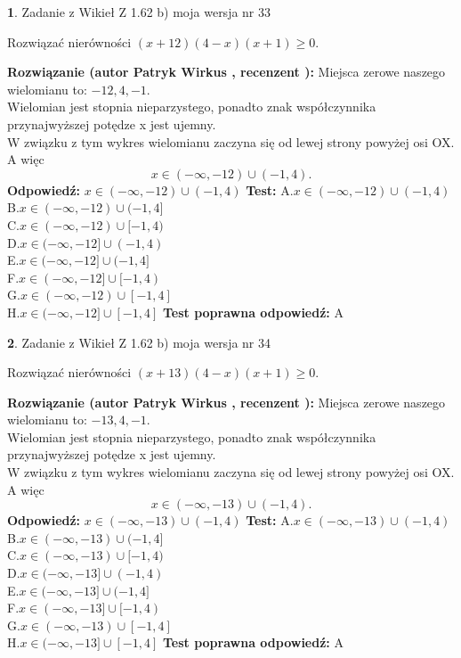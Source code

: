 \documentclass[12pt, a4paper]{article}
\theoremstyle{definition} %
\newtheorem{zad}{}
\newcommand{\zadStart}[1]{\begin{zad}#1\newline}
\newcommand{\zadStop}{\end{zad}}
\newcommand{\rozwStart}[2]{\noindent \textbf{Rozwiązanie (autor #1 , recenzent #2): }\newline}
\newcommand{\rozwStop}{\newline}
\newcommand{\odpStart}{\noindent \textbf{Odpowiedź:}\newline}
\newcommand{\odpStop}{\newline}
\newcommand{\testStart}{\noindent \textbf{Test:}\newline}
\newcommand{\testStop}{\newline}
\newcommand{\kluczStart}{\noindent \textbf{Test poprawna odpowiedź:}\newline}
\newcommand{\kluczStop}{\newline}
\begin{document}
\zadStart{Zadanie z Wikieł Z 1.62 b) moja wersja nr 33}

Rozwiązać nierówności $(x+12)(4-x)(x+1)\ge0$.
\zadStop
\rozwStart{Patryk Wirkus}{}
Miejsca zerowe naszego wielomianu to: $-12, 4, -1$.\\
Wielomian jest stopnia nieparzystego, ponadto znak współczynnika przy\linebreak najwyższej potędze x jest ujemny.\\ W związku z tym wykres wielomianu zaczyna się od lewej strony powyżej osi OX. A więc $$x \in (-\infty,-12) \cup (-1,4).$$
\rozwStop
\odpStart
$x \in (-\infty,-12) \cup (-1,4)$
\odpStop
\testStart
A.$x \in (-\infty,-12) \cup (-1,4)$\\
B.$x \in (-\infty,-12) \cup (-1,4]$\\
C.$x \in (-\infty,-12) \cup [-1,4)$\\
D.$x \in (-\infty,-12] \cup (-1,4)$\\
E.$x \in (-\infty,-12] \cup (-1,4]$\\
F.$x \in (-\infty,-12] \cup [-1,4)$\\
G.$x \in (-\infty,-12) \cup [-1,4]$\\
H.$x \in (-\infty,-12] \cup [-1,4]$
\testStop
\kluczStart
A
\kluczStop



\zadStart{Zadanie z Wikieł Z 1.62 b) moja wersja nr 34}

Rozwiązać nierówności $(x+13)(4-x)(x+1)\ge0$.
\zadStop
\rozwStart{Patryk Wirkus}{}
Miejsca zerowe naszego wielomianu to: $-13, 4, -1$.\\
Wielomian jest stopnia nieparzystego, ponadto znak współczynnika przy\linebreak najwyższej potędze x jest ujemny.\\ W związku z tym wykres wielomianu zaczyna się od lewej strony powyżej osi OX. A więc $$x \in (-\infty,-13) \cup (-1,4).$$
\rozwStop
\odpStart
$x \in (-\infty,-13) \cup (-1,4)$
\odpStop
\testStart
A.$x \in (-\infty,-13) \cup (-1,4)$\\
B.$x \in (-\infty,-13) \cup (-1,4]$\\
C.$x \in (-\infty,-13) \cup [-1,4)$\\
D.$x \in (-\infty,-13] \cup (-1,4)$\\
E.$x \in (-\infty,-13] \cup (-1,4]$\\
F.$x \in (-\infty,-13] \cup [-1,4)$\\
G.$x \in (-\infty,-13) \cup [-1,4]$\\
H.$x \in (-\infty,-13] \cup [-1,4]$
\testStop
\kluczStart
A
\kluczStop
\end{document}
